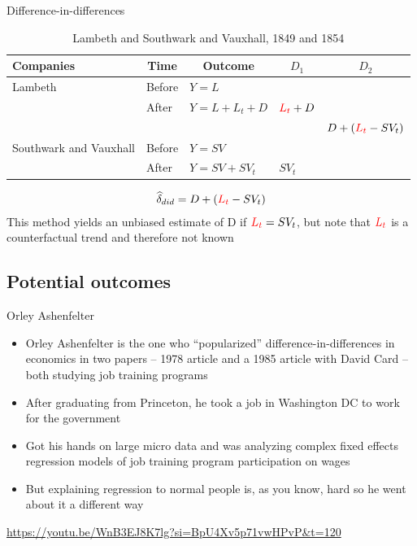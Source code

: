 \documentclass{beamer}
\begin{document}
\begin{frame}{Difference-in-differences}

\begin{table}\centering
\scriptsize
		\caption{Lambeth and Southwark and Vauxhall, 1849 and 1854}
		\begin{center}
		\begin{tabular}{lll|lc}
		\toprule
		\multicolumn{1}{l}{\textbf{Companies}}&
		\multicolumn{1}{c}{\textbf{Time}}&
		\multicolumn{1}{c}{\textbf{Outcome}}&
		\multicolumn{1}{c}{$D_1$}&
		\multicolumn{1}{c}{$D_2$}\\
		\midrule
		Lambeth & Before & $Y=L$ \\
		& After & $Y=L + L_t + D$ & $\textcolor{red}{L_t}+D$\\
		\midrule
		& & & & $D + (\textcolor{red}{L_t}- SV_t)$ \\
		\midrule
		Southwark and Vauxhall & Before & $Y=SV$ \\
		& After & $Y=SV + SV_t$ & $SV_t$\\
		\bottomrule
		\end{tabular}
		\end{center}
	\end{table}

\begin{eqnarray*}
\widehat{\delta}_{did} = D + (\textcolor{red}{L_t}- SV_t)
\end{eqnarray*}This method yields an unbiased estimate of D if $\textcolor{red}{L_t} = SV_t$, but note that $\textcolor{red}{L_t}$ is a counterfactual trend and therefore not known

\end{frame}







\subsection{Potential outcomes}


\begin{frame}{Orley Ashenfelter}

\begin{itemize}
\item Orley Ashenfelter is the one who ``popularized'' difference-in-differences in economics in two papers -- 1978 article and a 1985 article with David Card -- both studying job training programs
\item After graduating from Princeton, he took a job in Washington DC to work for the government
\item Got his hands on large micro data and was analyzing complex fixed effects regression models of job training program participation on wages
\item But explaining regression to normal people is, as you know, hard so he went about it a different way
\end{itemize}

\url{https://youtu.be/WnB3EJ8K7lg?si=BpU4Xv5p71vwHPvP&t=120}

\end{frame}
\end{document}
